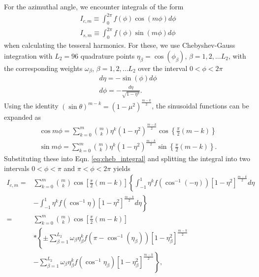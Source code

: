 For the azimuthal angle, we encounter integrals of the form
%
\begin{equation} \begin{aligned} I_{c,m} \equiv \int^{2\pi}_0 f(\phi)
        \cos(m\phi)d\phi \\ I_{s,m} \equiv \int^{2\pi}_0 f(\phi) \sin(m\phi)d\phi
    \end{aligned} \label{eq:cheb_integral} \end{equation}
%
when calculating the tesseral harmonics. For these, we use Chebyshev-Gauss
integration with $L_{2}=96$ quadrature points $\eta_{\beta}=\cos(\phi_{\beta})$,
$\beta = 1,2,\dots L_{2}$, with the corresponding weights $\omega_{\beta}$, $\beta =
1,2,\dots L_{2}$ over the interval $0<\phi<2\pi$  
%
\begin{equation} \begin{aligned} d\eta = -\sin(\phi)d\phi \\ d\phi = -
        \frac{d\eta}{\sqrt{1-\eta^2}}.  \end{aligned} \end{equation}
%
Using the identity $(\sin\theta)^{m-k}=(1-\mu^2)^{\frac{m-k}{2}}$, the sinusoidal
functions can be expanded as
%
\begin{equation} \begin{aligned} \cos{m\phi} = \sum^m_{k=0} { m \choose k } \eta^k
        (1-\eta^2)^{\frac{m-k}{2}} \cos\left\{ \frac{\pi}{2}(m-k) \right\} \\
        \sin{m\phi} = \sum^m_{k=0} { m \choose k } \eta^k (1-\eta^2)^{\frac{m-k}{2}}
        \sin\left\{ \frac{\pi}{2}(m-k) \right\}.  \end{aligned} \end{equation}
%
Substituting these into Eqn. \eqref{eq:cheb_integral} and splitting the integral into
two intervals $0<\phi<\pi$ and $\pi<\phi<2\pi$ yields
%
\begin{equation} \begin{aligned} I_{c,m} =& \sum^m_{k=0}{ m \choose k } \cos \left[
        \frac{\pi}{2}(m-k) \right] \left\{ \int^{1}_{-1} \eta^k f(\cos^{-1}(-\eta))
        \left[ 1 - \eta^2 \right]^{\frac{m-k}{2}} d\eta \right. \\ &- \left.
        \int^{1}_{-1} \eta^k f(\cos^{-1}\eta) \left[ 1 - \eta^2
        \right]^{\frac{m-k}{2}} d\eta \right\} \\ =& \sum^m_{k=0}{ m \choose k } \cos
        \left[ \frac{\pi}{2}(m-k) \right] \\ &* \left\{ \pm \sum^{L_2}_{\beta =1}
        \omega_\beta \eta_{\beta}^k f(\pi - \cos^{-1}(\eta_{\beta})) \left[ 1 -
        \eta_\beta^2 \right]^{\frac{m-k}{2}} \right. \\ &- \left. \sum^{L_2}_{\beta
        =1} \omega_\beta \eta_\beta^k f(\cos^{-1}\eta_\beta) \left[ 1 - \eta_\beta^2
        \right]^{\frac{m-k}{2}} \right\}, \end{aligned} \end{equation}
